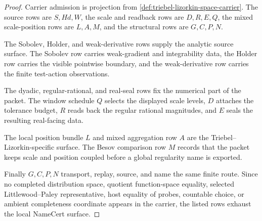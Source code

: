 \begin{proof}
Carrier admission is projection from \autoref{def:triebel-lizorkin-space-carrier}. The source rows are $S,Hd,W$, the scale and readback rows are $D,R,E,Q$, the mixed scale-position rows are $L,A,M$, and the structural rows are $G,C,P,N$.

The Sobolev, Holder, and weak-derivative rows supply the analytic source surface. The Sobolev row carries weak-gradient and integrability data, the Holder row carries the visible pointwise boundary, and the weak-derivative row carries the finite test-action observations.

The dyadic, regular-rational, and real-seal rows fix the numerical part of the packet. The window schedule $Q$ selects the displayed scale levels, $D$ attaches the tolerance budget, $R$ reads back the regular rational magnitudes, and $E$ seals the resulting real-facing data.

The local position bundle $L$ and mixed aggregation row $A$ are the Triebel--Lizorkin-specific surface. The Besov comparison row $M$ records that the packet keeps scale and position coupled before a global regularity name is exported.

Finally $G,C,P,N$ transport, replay, source, and name the same finite route. Since no completed distribution space, quotient function-space equality, selected Littlewood--Paley representative, host equality of probes, countable choice, or ambient completeness coordinate appears in the carrier, the listed rows exhaust the local NameCert surface.
\end{proof}

